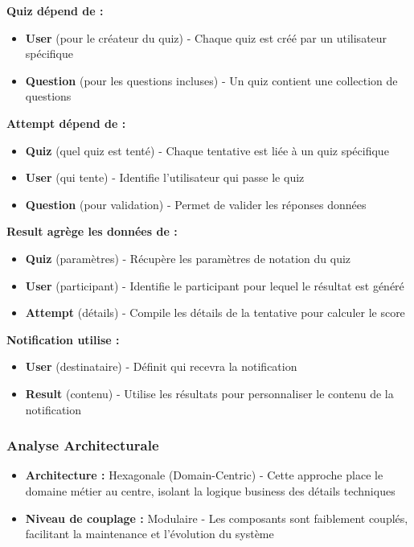 \documentclass[12pt,a4paper]{report}
\begin{document}
\textbf{Quiz dépend de :}
\begin{itemize}
    \item \textbf{User} (pour le créateur du quiz) - Chaque quiz est créé par un utilisateur spécifique
    \item \textbf{Question} (pour les questions incluses) - Un quiz contient une collection de questions
\end{itemize}

\textbf{Attempt dépend de :}
\begin{itemize}
    \item \textbf{Quiz} (quel quiz est tenté) - Chaque tentative est liée à un quiz spécifique
    \item \textbf{User} (qui tente) - Identifie l'utilisateur qui passe le quiz
    \item \textbf{Question} (pour validation) - Permet de valider les réponses données
\end{itemize}

\textbf{Result agrège les données de :}
\begin{itemize}
    \item \textbf{Quiz} (paramètres) - Récupère les paramètres de notation du quiz
    \item \textbf{User} (participant) - Identifie le participant pour lequel le résultat est généré
    \item \textbf{Attempt} (détails) - Compile les détails de la tentative pour calculer le score
\end{itemize}

\textbf{Notification utilise :}
\begin{itemize}
    \item \textbf{User} (destinataire) - Définit qui recevra la notification
    \item \textbf{Result} (contenu) - Utilise les résultats pour personnaliser le contenu de la notification
\end{itemize}

\subsubsection{Analyse Architecturale}

\begin{itemize}
    \item \textbf{Architecture :} Hexagonale (Domain-Centric) - Cette approche place le domaine métier au centre, isolant la logique business des détails techniques
    \item \textbf{Niveau de couplage :} Modulaire - Les composants sont faiblement couplés, facilitant la maintenance et l'évolution du système
\end{itemize}
\end{document}
